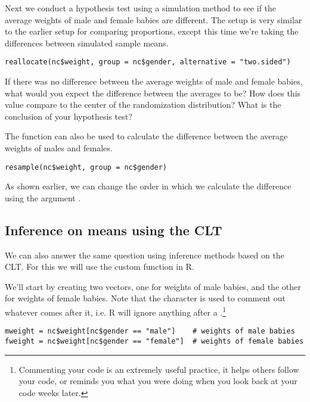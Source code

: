 \documentclass[11pt]{article}
\begin{document}
Next we conduct a hypothesis test using a simulation method to see if the average weights of male and female babies are different. The setup is very similar to the earlier setup for comparing proportions, except this time we're taking the differences between simulated sample means.

\begin{lstlisting}
reallocate(nc$weight, group = nc$gender, alternative = "two.sided")
\end{lstlisting}

\begin{exercise}
If there was no difference between the average weights of male and female babies, what would you expect the difference between the averages to be? How does this value compare to the center of the randomization distribution? What is the conclusion of your hypothesis test?
\end{exercise}

The  function can also be used to calculate the difference between the average weights of males and females.

\begin{lstlisting}
resample(nc$weight, group = nc$gender)
\end{lstlisting}

As shown earlier, we can change the order in which we calculate the difference using the argument .

\subsection*{Inference on means using the CLT}

We can also answer the same question using inference methods based on the CLT. For this we will use the custom function  in R.

We'll start by creating two vectors, one for weights of male babies, and the other for weights of female babies. Note that the character \code{#} is used to comment out whatever comes after it, i.e. R will ignore anything after a \code{#}.\footnote{Commenting your code is an extremely useful practice, it helps others follow your code, or reminds you what you were doing when you look back at your code weeks later.}

\begin{lstlisting}
mweight = nc$weight[nc$gender == "male"]	# weights of male babies
fweight = nc$weight[nc$gender == "female"]	# weights of female babies
\end{lstlisting}
\end{document}
